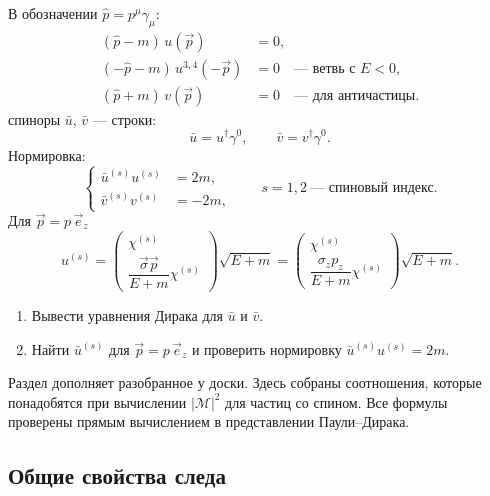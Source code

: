 \documentclass[../final.tex]{subfiles}
\begin{document}
В обозначении $\hat p=p^\mu\gamma_\mu$:
\begin{align*}
    (\hat p-m)\,u(\vec p)&=0,\\
    (-\hat p-m)\,u^{3,4}(-\vec p)&=0 \quad\text{--- ветвь с $E<0$},\\
    (\hat p+m)\,v(\vec p)&=0 \quad\text{--- для античастицы}.
\end{align*}
 спиноры $\bar u$, $\bar v$ --- строки:
\begin{equation*}
    \bar u=u^\dagger\gamma^0,
    \qquad
    \bar v=v^\dagger\gamma^0.
\end{equation*}
Нормировка:
\begin{equation*}
    \left\{
    \begin{aligned}
        \bar u^{(s)}u^{(s)}&=2m,\\
        \bar v^{(s)}v^{(s)}&=-2m,
    \end{aligned}
    \right.
    \qquad
    s=1,2\ \text{--- спиновый индекс}.
\end{equation*}
Для $\vec p=p\,\vec e_z$
\begin{equation*}
    u^{(s)}=
    \begin{pmatrix}
        \chi^{(s)}\\[0.2em]
        \dfrac{\vec\sigma\vec p}{E+m}\chi^{(s)}
    \end{pmatrix}\sqrt{E+m}
    =
    \begin{pmatrix}
        \chi^{(s)}\\[0.2em]
        \dfrac{\sigma_zp_z}{E+m}\chi^{(s)}
    \end{pmatrix}\sqrt{E+m}.
\end{equation*}

\begin{enumerate}[label=\arabic*)]
    \item Вывести уравнения Дирака для $\bar u$ и $\bar v$.
    \item Найти $\bar u^{(s)}$ для $\vec p=p\,\vec e_z$ и проверить нормировку
    $\bar u^{(s)}u^{(s)}=2m$.
\end{enumerate}


\remark
Раздел дополняет разобранное у доски. Здесь собраны соотношения,
которые понадобятся при вычислении $|\mathcal M|^2$ для частиц со спином.
Все формулы проверены прямым вычислением в представлении Паули--Дирака.

\subsection*{Общие свойства следа}
\end{document}
